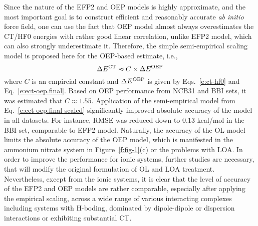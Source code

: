Since the nature of the EFP2 and OEP models is highly approximate,
and the most important goal is to construct efficient and reasonably
accurate \emph{ab initio} force field, one can use the fact that
OEP model almost always overestimates the CT/HF0 energies
with rather good linear correlation,
unlike EFP2 model, which can also strongly underestimate it.
Therefore, the simple semi\hyp{}empirical scaling model is proposed here
for the OEP\hyp{}based estimate, i.e.,
%
\begin{equation} \label{e:ect-oep.final-scaled}
 \Delta E^{\rm CT} \approx C \times \Delta E^{\rm OEP}
\end{equation}
%
where $C$ is an empircial constant and $\Delta E^{\rm OEP}$ is given by
Eqs.~\eqref{e:ct-hf0} and Eq.~\eqref{e:ect-oep.final}. Based on
OEP performance from NCB31 and BBI sets, it was estimated
that $C\approx 1.55$. Application of the semi\hyp{}empirical model
from Eq.~\eqref{e:ect-oep.final-scaled} significantly improved
absolute accuracy of the model in all datasets. 
For instance, RMSE was reduced down to 0.13 kcal/mol in the BBI set,
comparable to EFP2 model.
Naturally, the accuracy of the OL model limits the absolute accuracy
of the OEP model, which is manifested in the ammonium nitrate system
in Figure~\ref{f:fig-1}(c) or the problems with LOA. 
In order to improve the performance for ionic systems,
further studies are necessary, that will modify the original formulation
of OL and LOA treatment. Nevertheless, except from the ionic systems,
it is clear that the level of accuracy of the EFP2 and OEP models are rather comparable,
especially after applying the empirical scaling,
across a wide range of various interacting complexes including 
systems with H-boding, dominated by dipole-dipole or dispersion interactions or 
exhibiting substantial CT.






